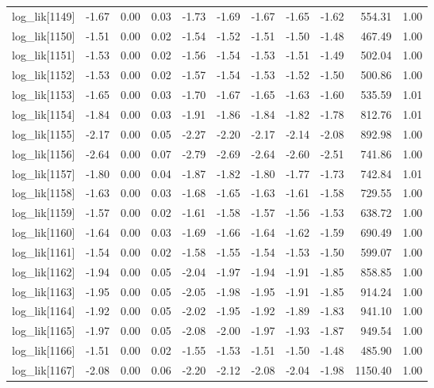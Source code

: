 \begin{table}[ht]
\begin{tabular}{rrrrrrrrrrr}
  log\_lik[1149] & -1.67 & 0.00 & 0.03 & -1.73 & -1.69 & -1.67 & -1.65 & -1.62 & 554.31 & 1.00 \\ 
  log\_lik[1150] & -1.51 & 0.00 & 0.02 & -1.54 & -1.52 & -1.51 & -1.50 & -1.48 & 467.49 & 1.00 \\ 
  log\_lik[1151] & -1.53 & 0.00 & 0.02 & -1.56 & -1.54 & -1.53 & -1.51 & -1.49 & 502.04 & 1.00 \\ 
  log\_lik[1152] & -1.53 & 0.00 & 0.02 & -1.57 & -1.54 & -1.53 & -1.52 & -1.50 & 500.86 & 1.00 \\ 
  log\_lik[1153] & -1.65 & 0.00 & 0.03 & -1.70 & -1.67 & -1.65 & -1.63 & -1.60 & 535.59 & 1.01 \\ 
  log\_lik[1154] & -1.84 & 0.00 & 0.03 & -1.91 & -1.86 & -1.84 & -1.82 & -1.78 & 812.76 & 1.01 \\ 
  log\_lik[1155] & -2.17 & 0.00 & 0.05 & -2.27 & -2.20 & -2.17 & -2.14 & -2.08 & 892.98 & 1.00 \\ 
  log\_lik[1156] & -2.64 & 0.00 & 0.07 & -2.79 & -2.69 & -2.64 & -2.60 & -2.51 & 741.86 & 1.00 \\ 
  log\_lik[1157] & -1.80 & 0.00 & 0.04 & -1.87 & -1.82 & -1.80 & -1.77 & -1.73 & 742.84 & 1.01 \\ 
  log\_lik[1158] & -1.63 & 0.00 & 0.03 & -1.68 & -1.65 & -1.63 & -1.61 & -1.58 & 729.55 & 1.00 \\ 
  log\_lik[1159] & -1.57 & 0.00 & 0.02 & -1.61 & -1.58 & -1.57 & -1.56 & -1.53 & 638.72 & 1.00 \\ 
  log\_lik[1160] & -1.64 & 0.00 & 0.03 & -1.69 & -1.66 & -1.64 & -1.62 & -1.59 & 690.49 & 1.00 \\ 
  log\_lik[1161] & -1.54 & 0.00 & 0.02 & -1.58 & -1.55 & -1.54 & -1.53 & -1.50 & 599.07 & 1.00 \\ 
  log\_lik[1162] & -1.94 & 0.00 & 0.05 & -2.04 & -1.97 & -1.94 & -1.91 & -1.85 & 858.85 & 1.00 \\ 
  log\_lik[1163] & -1.95 & 0.00 & 0.05 & -2.05 & -1.98 & -1.95 & -1.91 & -1.85 & 914.24 & 1.00 \\ 
  log\_lik[1164] & -1.92 & 0.00 & 0.05 & -2.02 & -1.95 & -1.92 & -1.89 & -1.83 & 941.10 & 1.00 \\ 
  log\_lik[1165] & -1.97 & 0.00 & 0.05 & -2.08 & -2.00 & -1.97 & -1.93 & -1.87 & 949.54 & 1.00 \\ 
  log\_lik[1166] & -1.51 & 0.00 & 0.02 & -1.55 & -1.53 & -1.51 & -1.50 & -1.48 & 485.90 & 1.00 \\ 
  log\_lik[1167] & -2.08 & 0.00 & 0.06 & -2.20 & -2.12 & -2.08 & -2.04 & -1.98 & 1150.40 & 1.00 \\ 

\end{tabular}
\end{table}
